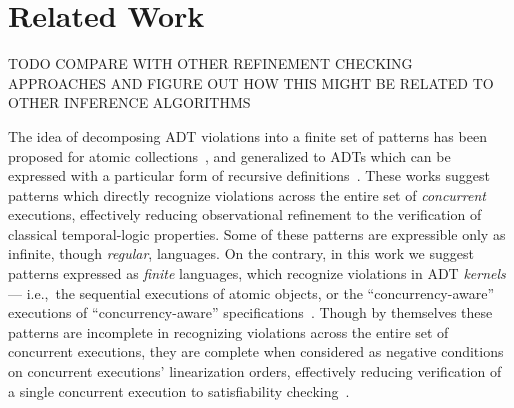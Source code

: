 \section{Related Work}
\label{sec:related}

TODO COMPARE WITH OTHER REFINEMENT CHECKING APPROACHES AND FIGURE OUT HOW THIS
MIGHT BE RELATED TO OTHER INFERENCE ALGORITHMS

The idea of decomposing ADT violations into a finite set of patterns has been
proposed for atomic collections~\cite{conf/concur/HenzingerSV13,
conf/popl/DoddsHK15, conf/popl/BouajjaniEEH15}, and generalized to ADTs which
can be expressed with a particular form of recursive
definitions~\cite{journals/arxiv/BouajjaniEEH15}. These works suggest patterns
which directly recognize violations across the entire set of \emph{concurrent}
executions, effectively reducing observational refinement to the verification
of classical temporal-logic properties. Some of these patterns are expressible
only as infinite, though \emph{regular}, languages. On the contrary, in this
work we suggest patterns expressed as \emph{finite} languages, which recognize
violations in ADT \emph{kernels} — i.e.,~the sequential executions of atomic
objects, or the “concurrency-aware” executions of “concurrency-aware”
specifications~\cite{conf/podc/HemedR14}. Though by themselves these patterns
are incomplete in recognizing violations across the entire set of concurrent
executions, they are complete when considered as negative conditions on
concurrent executions’ linearization orders, effectively reducing verification
of a single concurrent execution to satisfiability
checking~\cite{conf/pldi/EmmiEH15}.
